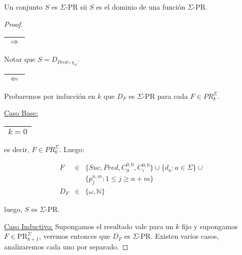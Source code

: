   \begin{proposition}
    \par Un conjunto $S$ es $\Sigma$-PR sii $S$ es el dominio de una función $\Sigma$-PR.
  \end{proposition}
  \begin{proof}
    \begin{tabular}{|c|} \hline $\Rightarrow$ \\\hline \end{tabular} Notar que $S = D_{Pred \circ \chi_{S}}$.

    \begin{tabular}{|c|} \hline $\Leftarrow$ \\\hline \end{tabular} Probaremos por inducción en $k$ que $D_{F}$ es
    $\Sigma$-PR para cada $F \in PR_{k}^{\Sigma}$.

    \vspace{3mm}
    \underline{Caso Base:} \begin{tabular}{|c|} \hline $k = 0$ \\\hline \end{tabular} es decir, $F \in PR_{0}^{\Sigma}$.
    Luego:

    \begin{eqnarray}
      \nonumber F &\in& \{Suc, Pred, C_{0}^{0,0}, C_{\varepsilon}^{0,0}\} \cup \{d_{a}: a \in \Sigma\} \cup \\
      \nonumber && \{p_{j}^{n,m}: 1 \leq j \geq n+m\} \\
      \nonumber D_{F} &\in& \{\omega, \mathbb{N}\}
    \end{eqnarray}

    \par luego, $S$ es $\Sigma$-PR.

    \vspace{3mm}
    \underline{Caso Inductivo:} Supongamos el resultado vale para un $k$ fijo y supongamos $F \in
    \mathrm{PR}_{k+1}^{\Sigma}$, veremos entonces que $D_{F}$ es $\Sigma$-PR. Existen varios casos, analizaremos cada
    uno por separado.


\end{proof}

